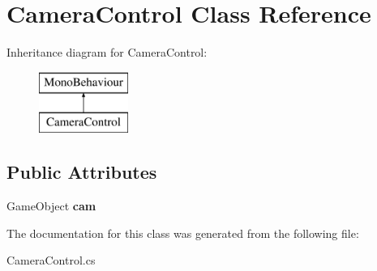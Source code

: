 \hypertarget{class_camera_control}{}\section{Camera\+Control Class Reference}
\label{class_camera_control}
Inheritance diagram for Camera\+Control\+:\begin{figure}[H]
\begin{center}
\leavevmode
\includegraphics[height=2.000000cm]{class_camera_control}
\end{center}
\end{figure}
\subsection*{Public Attributes}
\begin{DoxyCompactItemize}
\item 
\mbox{\label{class_camera_control_a59527d10410db43a9a53106206435541}} 
Game\+Object {\bfseries cam}
\end{DoxyCompactItemize}


The documentation for this class was generated from the following file\+:\begin{DoxyCompactItemize}
\item 
Camera\+Control.\+cs\end{DoxyCompactItemize}
